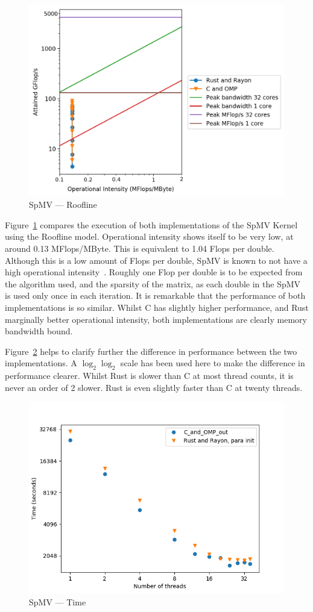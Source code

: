 \begin{figure}[h]
\centering
\includegraphics[width=.9\linewidth]{figs/sparse/roofline.png}
\caption{SpMV --- Roofline}\label{fig:roofline}
\end{figure}

Figure~\ref{fig:roofline} compares the execution of both implementations of the SpMV Kernel using the Roofline model. Operational intensity shows itself to be very low, at around 0.13 MFlops/MByte. This is equivalent to 1.04 Flops per double.
Although this is a low amount of Flops per double, SpMV is known to not have a high operational intensity~\cite{SparseArith}. Roughly one Flop per double is to be expected from the algorithm used, and the sparsity of the matrix, as each double in the SpMV is used only once in each iteration.
It is remarkable that the performance of both implementations is so similar. Whilst C has slightly higher performance, and Rust marginally better operational intensity, both implementations are clearly memory bandwidth bound. 

Figure~\ref{fig:sparse-time} helps to clarify further the difference in performance between  the two implementations. A $\log_2 \log_2$ scale has been used here to make the difference in performance clearer. Whilst Rust is slower than C at most thread counts, it is never an order of 2 slower.
Rust is even slightly faster than C at twenty threads. 
\begin{figure}[h]
\centering
\includegraphics[width=.9\linewidth]{figs/sparse/time.png}
\caption{SpMV --- Time}\label{fig:sparse-time}
\end{figure}

